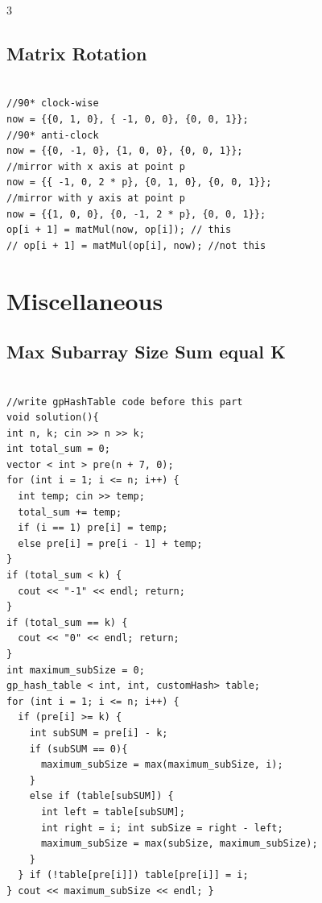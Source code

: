 \documentclass[10pt, landscape, a4paper, onesided]{extarticle}
\begin{document}
\begin{multicols*}{3}
\subsection{Matrix Rotation}
\begin{verbatim}

//90* clock-wise
now = {{0, 1, 0}, { -1, 0, 0}, {0, 0, 1}};
//90* anti-clock
now = {{0, -1, 0}, {1, 0, 0}, {0, 0, 1}};
//mirror with x axis at point p
now = {{ -1, 0, 2 * p}, {0, 1, 0}, {0, 0, 1}};
//mirror with y axis at point p
now = {{1, 0, 0}, {0, -1, 2 * p}, {0, 0, 1}};
op[i + 1] = matMul(now, op[i]); // this
// op[i + 1] = matMul(op[i], now); //not this
\end{verbatim}

\section{Miscellaneous}
\subsection{Max Subarray Size Sum equal K}
\begin{verbatim}

//write gpHashTable code before this part
void solution(){
int n, k; cin >> n >> k;
int total_sum = 0;
vector < int > pre(n + 7, 0);
for (int i = 1; i <= n; i++) {
  int temp; cin >> temp;
  total_sum += temp;
  if (i == 1) pre[i] = temp;
  else pre[i] = pre[i - 1] + temp;
}
if (total_sum < k) {
  cout << "-1" << endl; return;
}
if (total_sum == k) {
  cout << "0" << endl; return;
}
int maximum_subSize = 0;
gp_hash_table < int, int, customHash> table;
for (int i = 1; i <= n; i++) {
  if (pre[i] >= k) {
    int subSUM = pre[i] - k;
    if (subSUM == 0){
      maximum_subSize = max(maximum_subSize, i);
    }
    else if (table[subSUM]) {
      int left = table[subSUM];
      int right = i; int subSize = right - left;
      maximum_subSize = max(subSize, maximum_subSize);
    }
  } if (!table[pre[i]]) table[pre[i]] = i;
} cout << maximum_subSize << endl; }
\end{verbatim}


\end{multicols*}
\end{document}
